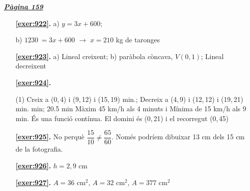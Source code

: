 \hyperlink{page.159}{\textbf{\em Pàgina 159}}
\begin{enumerate}
\item[\fontfamily{phv}\selectfont\color{blue}\textbf{\ref{exer:922}. }] \label{ans:922} 
 a) $y=3x+600$; \par b) $\mathrm {1230}\mathrm {\ }=3x+600$ $\rightarrow $ $x=210$ kg de taronges
 \end{enumerate}
\begin{enumerate}
\item[\fontfamily{phv}\selectfont\color{blue}\textbf{\ref{exer:923}. }] \label{ans:923} 
 a) Lineal creixent; \quad b) paràbola còncava, $V(0,1)$; \quad Lineal decreixent



 \item[\fontfamily{phv}\selectfont\color{blue}\textbf{\ref{exer:924}. }] \label{ans:924}
 \begin{tasks}[column-sep=1em, item-indent=1.3333em](1)
	 \task* Creix a (0,\,4) i (9,\,12) i (15,\,19) min.; Decreix a (4,\,9) i (12,\,12) i (19,\,21) min.
	  min; 20.5 min
	 \task* Màxim 45 km/h als 4 minuts i Mínima de 15 km/h als 9 min.
	 \task* És una funció contínua. El domini és (0,\,21) i el recorregut (0,\,45) 
\end{tasks}
\item[\fontfamily{phv}\selectfont\color{blue}\textbf{\ref{exer:925}. }] \label{ans:925} 
No perquè $\dfrac {15}{10} \neq \dfrac { 65}{60}$. Només podríem dibuixar 13 cm dels 15 cm de la fotografia.
\item[\fontfamily{phv}\selectfont\color{blue}\textbf{\ref{exer:926}. }] \label{ans:926} 
$h=2,9$ cm
\item[\fontfamily{phv}\selectfont\color{blue}\textbf{\ref{exer:927}. }] \label{ans:927} 
$A=36$ cm$^2$, $A=32$ cm$^2$, $A=377$ cm$^2$
 \end{enumerate}
\vspace{0.3cm}


